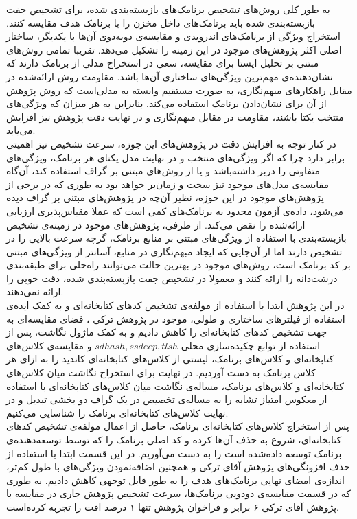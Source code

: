 
\label{conclusion}
به طور کلی روش‌های تشخیص برنامک‌های بازبسته‌بندی شده، برای تشخیص جفت بازبسته‌بندی شده باید برنامک‌های داخل مخزن را با برنامک‌ هدف مقایسه کنند. استخراج ويژگی‌ از برنامک‌های اندرویدی و مقایسه‌ی دوبه‌دوی آن‌ها با یکدیگر، ساختار اصلی اکثر پژوهش‌های موجود در این زمینه را تشکیل می‌دهد. تقریبا تمامی روش‌های مبتنی بر تحلیل ایستا برای مقایسه‌، سعی در استخراج مدلی از برنامک دارند که نشان‌دهنده‌ی مهم‌ترین ویژگی‌های ساختاری آن‌ها باشد. مقاومت روش ارائه‌شده در مقابل راهکار‌های مبهم‌نگاری، به صورت مستقیم وابسته به مدلی‌است که روش پژوهش از آن برای نشان‌دادن برنامک استفاده می‌کند. بنابراین به هر میزان که ویژگی‌های منتخب یکتا باشند، مقاومت در مقابل مبهم‌نگاری و در نهایت دقت پژوهش نیز افزایش می‌یابد.\\
در کنار توجه به افزایش دقت در پژوهش‌های این جوزه، سرعت تشخیص نیز اهمیتی برابر دارد چرا که اگر ویژگی‌های منتخب و در نهایت مدل یکتای‌ هر برنامک، ویژگی‌های متفاوتی را دربر داشته‌باشد و یا از روش‌های مبتنی بر گراف استفاده کند، آن‌گاه مقایسه‌ی مدل‌های موجود نیز سخت و زمان‌بر خواهد بود به طوری که در برخی از پژوهش‌های موجود در این حوزه، نظیر آن‌چه در پژوهش‌های مبتنی بر گراف دیده می‌شود، داده‌ی آزمون محدود به برنامک‌های کمی است که عملا مقیاس‌پذیری ارزیابی ارائه‌شده را نقض می‌کند.  از طرفی، پژوهش‌های موجود در زمینه‌ی تشخیص بازبسته‌بندی با استفاده از ویژگی‌های مبتنی بر منابع برنامک، گرچه سرعت بالایی را در تشخیص دارند اما از آن‌جایی که ایجاد مبهم‌نگاری در منابع، آسانتر از ویژگی‌های مبتنی بر کد برنامک است، روش‌های موجود در بهترین حالت می‌توانند راه‌حلی برای طبقه‌بندی درشت‌دانه را ارائه کنند و معمولا در تشخیص جفت ‌بازبسته‌بندی شده، دقت خوبی را ارائه نمی‌دهند.\\
در این پژوهش ابتدا با استفاده از مولفه‌ی تشخیص کد‌های کتابخانه‌ای و به کمک ایده‌ی استفاده از فیلتر‌های ساختاری و طولی، موجود در پژوهش ترکی ، فضای مقایسه‌‌ای به جهت تشخیص کد‌های کتابخانه‌ای را کاهش دادیم و به کمک ماژول نگاشت، پس از استفاده از توابع چکیده‌سازی محلی $sdhash,ssdeep,tlsh$ و مقایسه‌ی کلاس‌های کتابخانه‌ای و کلاس‌های برنامک، لیستی از کلاس‌های کتابخانه‌ای کاندید را به ازای هر کلاس برنامک به دست آوردیم. در نهایت برای استخراج نگاشت میان کلاس‌های کتابخانه‌ای و کلاس‌های برنامک، مساله‌ی نگاشت میان کلاس‌های کتابخانه‌ای با استفاده از معکوس امتیاز تشابه را به مساله‌ی تخصیص در یک گراف دو بخشی تبدیل و در نهایت کلاس‌های کتابخانه‌ای برنامک را شناسایی می‌کنیم. \\
پس از استخراچ کلاس‌های کتابخانه‌ای برنامک، حاصل از اعمال مولفه‌ی تشخیص کد‌های کتابخانه‌ای، شروع به حذف آن‌ها کرده و کد اصلی برنامک را که توسط توسعه‌دهنده‌ی برنامک توسعه‌ داده‌شده است را به دست می‌آوریم. در این قسمت ابتدا با استفاده از حذف افزونگی‌های پژوهش آقای ترکی و همچنین اضافه‌نمودن ویژگی‌های با طول کم‌تر، اندازه‌ی امضای نهایی برنامک‌های هدف را به طور قابل توجهی کاهش دادیم. به طوری که در قسمت مقایسه‌ی دودویی برنامک‌ها، سرعت تشخیص پژوهش جاری در مقایسه با پژوهش آقای ترکی ۶ برابر و فراخوان پژوهش تنها ۱ درصد افت را تجربه‌ کرده‌است. 

